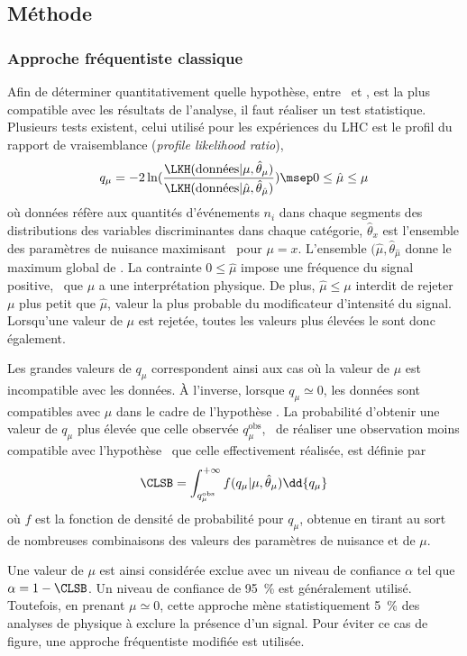\subsection{Méthode \CLS}\label{chapter-HTT_analysis-section-signal_extraction-CLS}
\subsubsection{Approche fréquentiste classique}
Afin de déterminer quantitativement quelle hypothèse, entre \hypB\ et \hypSB, est la plus compatible avec les résultats de l'analyse, il faut réaliser un test statistique.
Plusieurs tests existent, celui utilisé pour les expériences du LHC est le profil du rapport de vraisemblance (\emph{profile likelihood ratio}),
\begin{equation}
q_{\mu} = -2 \ln(\frac{\LKH(\text{données} |  \mu, \hat{\theta}_{\mu})}{\LKH(\text{données} |  \hat{\mu}, \hat{\theta}_{\hat{\mu}})})
\msep
0 \leq \hat{\mu} \leq \mu
\end{equation}
où
\og données \fg{} réfère aux quantités d'événements $n_i$ dans chaque segments des distributions des variables discriminantes dans chaque catégorie,
$\hat{\theta}_x$ est l'ensemble des paramètres de nuisance maximisant \LKH\ pour $\mu=x$.
L'ensemble $(\hat{\mu},\hat{\theta}_{\hat{\mu}}$ donne le maximum global de \LKH.
La contrainte $0 \leq \hat{\mu}$ impose une fréquence du signal positive, \ie\ que $\mu$ a une interprétation physique.
De plus, $\hat{\mu} \leq \mu$ interdit de rejeter $\mu$ plus petit que $\hat{\mu}$, valeur la plus probable du modificateur d'intensité du signal.
Lorsqu'une valeur de $\mu$ est rejetée, toutes les valeurs plus élevées le sont donc également.
\par
Les grandes valeurs de $q_{\mu}$ correspondent ainsi aux cas où la valeur de $\mu$ est incompatible avec les données.
À l'inverse, lorsque $q_{\mu}\simeq0$, les données sont compatibles avec $\mu$ dans le cadre de l'hypothèse \hypSB.
La probabilité d'obtenir une valeur de $q_{\mu}$ plus élevée que celle observée $q_{\mu}^\text{obs}$,
\ie\ de réaliser une observation moins compatible avec l'hypothèse \hypSB\ que celle effectivement réalisée,
est définie par
\begin{equation}
\CLSB = \int_{q_{\mu}^\text{obs}}^{+\infty} f (q_\mu | \mu, \hat{\theta}_\mu) \dd{q_\mu}
\end{equation}
où $f$ est la fonction de densité de probabilité pour $q_{\mu}$, obtenue en tirant au sort de nombreuses combinaisons des valeurs des paramètres de nuisance et de $\mu$.
\par
Une valeur de $\mu$ est ainsi considérée exclue avec un niveau de confiance $\alpha$ tel que
$\alpha = 1 - \CLSB$.
Un niveau de confiance de \SI{95}{\%} est généralement utilisé.
Toutefois, en prenant $\mu\simeq0$, cette approche mène statistiquement \SI{5}{\%} des analyses de physique à exclure la présence d'un signal.
Pour éviter ce cas de figure, une approche fréquentiste modifiée est utilisée.
